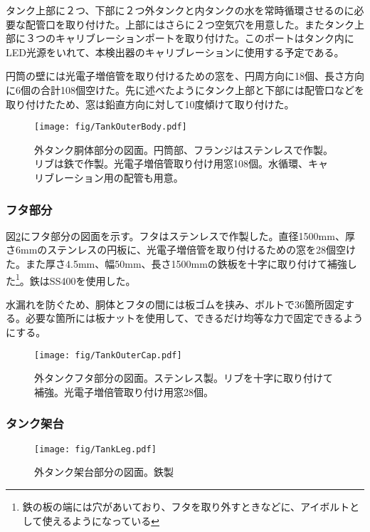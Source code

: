 \documentclass[11pt]{ltjsreport}
\newcommand{\figref}[1]{図\ref{#1}}
\begin{document}
タンク上部に２つ、下部に２つ外タンクと内タンクの水を常時循環させるのに必要な配管口を取り付けた。上部にはさらに２つ空気穴を用意した。またタンク上部に３つのキャリブレーションポートを取り付けた。このポートはタンク内にLED光源をいれて、本検出器のキャリブレーションに使用する予定である。

円筒の壁には光電子増倍管を取り付けるための窓を、円周方向に18個、長さ方向に6個の合計108個空けた。先に述べたようにタンク上部と下部には配管口などを取り付けたため、窓は鉛直方向に対して10度傾けて取り付けた。



\begin{figure}[htbp]
\centering
\texttt{[image: fig/TankOuterBody.pdf]}
\caption[外タンク胴体部分の図面]{外タンク胴体部分の図面。円筒部、フランジはステンレスで作製。リブは鉄で作製。光電子増倍管取り付け用窓108個。水循環、キャリブレーション用の配管も用意。}
\label{TankOuterBody}
\end{figure}

\subsubsection{フタ部分}
\figref{TankOuterCap}にフタ部分の図面を示す。フタはステンレスで作製した。直径1500mm、厚さ6mmのステンレスの円板に、光電子増倍管を取り付けるための窓を28個空けた。また厚さ4.5mm、幅50mm、長さ1500mmの鉄板を十字に取り付けて補強した\footnote{鉄の板の端には穴があいており、フタを取り外すときなどに、アイボルトとして使えるようになっている}。鉄はSS400を使用した。

水漏れを防ぐため、胴体とフタの間には板ゴムを挟み、ボルトで36箇所固定する。必要な箇所には板ナットを使用して、できるだけ均等な力で固定できるようにする。

\begin{figure}[htbp]
\centering
\texttt{[image: fig/TankOuterCap.pdf]}
\caption[外タンクフタ部分の図面]{外タンクフタ部分の図面。ステンレス製。リブを十字に取り付けて補強。光電子増倍管取り付け用窓28個。}
\label{TankOuterCap}
\end{figure}

\subsubsection{タンク架台}

\begin{figure}[htbp]
\centering
\texttt{[image: fig/TankLeg.pdf]}
\caption[外タンク架台部分の図面]{外タンク架台部分の図面。鉄製}
\label{TankLeg}
\end{figure}
\end{document}
